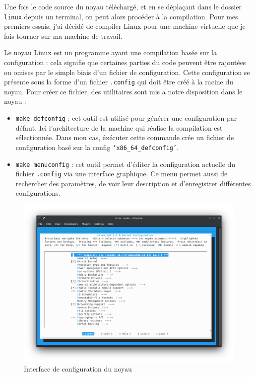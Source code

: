 Une fois le code source du noyau téléchargé, et en se déplaçant dans le dossier \texttt{linux} depuis un terminal, on peut alors procéder à la compilation. Pour mes premiers essais, j'ai décidé de compiler Linux pour une machine virtuelle que je fais tourner sur ma machine de travail.

Le noyau Linux est un programme ayant une compilation basée sur la configuration : cela signifie que certaines parties du code peuvent être rajoutées ou omises par le simple biais d'un fichier de configuration. Cette configuration se présente sous la forme d'un fichier \texttt{.config} qui doit être créé à la racine du noyau. Pour créer ce fichier, des utilitaires sont mis a notre disposition dans le noyau :
\begin{itemize}
    \item \texttt{make defconfig} : cet outil est utilisé pour générer une configuration par défaut. Ici l'architecture de la machine qui réalise la compilation est sélectionnée. Dans mon cas, éxécuter cette commande crée un fichier de configuration basé sur la config \texttt{'x86\_64\_defconfig'}.
    \item \texttt{make menuconfig} : cet outil permet d'éditer la configuration actuelle du fichier \texttt{.config} via une interface graphique. Ce menu permet aussi de rechercher des paramètres, de voir leur description et d'enregistrer différentes configurations.
\end{itemize}

\begin{figure}[H]
    \centering
    \includegraphics[width=0.65\paperwidth]{Images/make menuconfig.png}
    \caption{Interface de configuration du noyau}
\end{figure}

